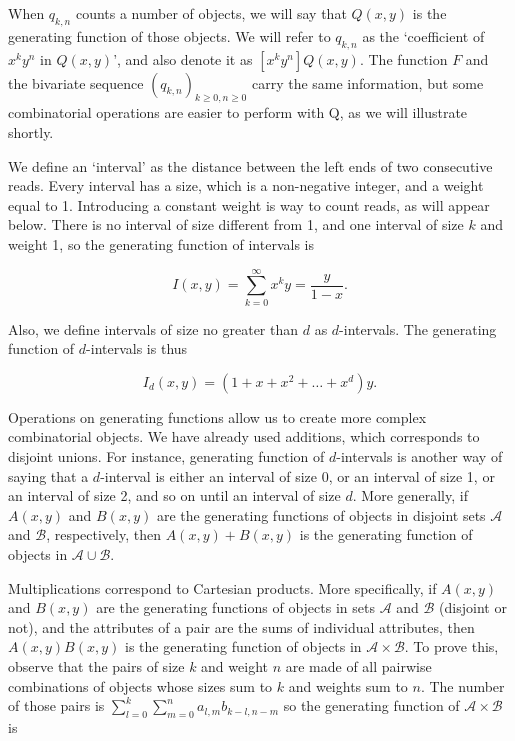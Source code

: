 \documentclass{article}
\begin{document}
When $q_{k,n}$ counts a number of objects, we will say that $Q(x,y)$ is
the generating function of those objects. We will refer to $q_{k,n}$ as
the `coefficient of $x^ky^n$ in $Q(x,y)$', and also denote it as $[x^ky^n]
Q(x,y)$. The function $F$ and the bivariate sequence $(q_{k,n})_{k \geq 0,
n \geq 0}$ carry the same information, but some combinatorial operations
are easier to perform with Q, as we will illustrate shortly.

We define an `interval' as the distance between the left ends of two
consecutive reads. Every interval has a size, which is a non-negative
integer, and a weight equal to 1. Introducing a constant weight is way to
count reads, as will appear below. There is no interval of size different
from 1, and one interval of size $k$ and weight 1, so the generating
function of intervals is

\begin{equation*}
I(x,y) = \sum_{k=0}^\infty x^ky = \frac{y}{1-x}.
\end{equation*}

Also, we define intervals of size no greater than $d$ as $d$-intervals.
The generating function of $d$-intervals is thus

\begin{equation*}
I_d(x,y) = (1+x+x^2+\ldots+x^d)y.
\end{equation*}

Operations on generating functions allow us to create more complex
combinatorial objects. We have already used additions, which corresponds
to disjoint unions. For instance, generating function of $d$-intervals is
another way of saying that a $d$-interval is either an interval of size 0,
or an interval of size 1, or an interval of size 2, and so on until an
interval of size $d$. More generally, if $A(x,y)$ and $B(x,y)$ are the
generating functions of objects in disjoint sets $\mathcal{A}$ and
$\mathcal{B}$, respectively, then $A(x,y)+B(x,y)$ is the generating
function of objects in $\mathcal{A} \cup \mathcal{B}$.

Multiplications correspond to Cartesian products. More specifically, if
$A(x,y)$ and $B(x,y)$ are the generating functions of objects in sets
$\mathcal{A}$ and $\mathcal{B}$ (disjoint or not), and the attributes of a
pair are the sums of individual attributes, then $A(x,y)B(x,y)$ is the
generating function of objects in $\mathcal{A} \times \mathcal{B}$. To
prove this, observe that the pairs of size $k$ and weight $n$ are made of
all pairwise combinations of objects whose sizes sum to $k$ and weights
sum to $n$. The number of those pairs is $\sum_{l=0}^k \sum_{m=0}^n
a_{l,m}b_{k-l,n-m}$ so the generating function of $\mathcal{A} \times
\mathcal{B}$ is
\end{document}
